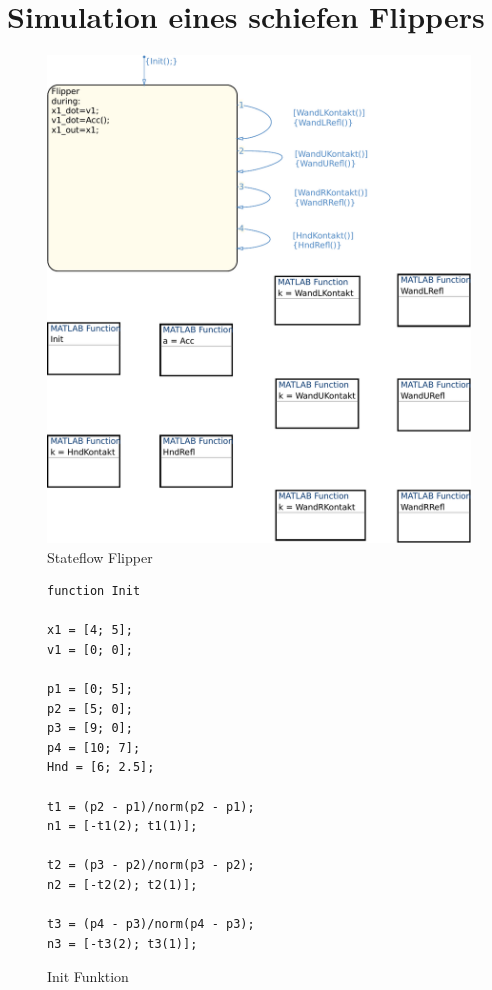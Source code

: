 \documentclass[10pt,a4paper]{article}
\begin{document}
\section{Simulation eines schiefen Flippers}
\begin{figure}[H]
	\centering
	\includegraphics[width=1\textwidth]{../aufgabe2/screens/Flipper}
	 	 	 	 		\caption{Stateflow Flipper}
\end{figure}

\begin{figure}[H]
\begin{lstlisting}
function Init

x1 = [4; 5];
v1 = [0; 0];

p1 = [0; 5];
p2 = [5; 0];
p3 = [9; 0];
p4 = [10; 7];
Hnd = [6; 2.5];

t1 = (p2 - p1)/norm(p2 - p1);
n1 = [-t1(2); t1(1)];

t2 = (p3 - p2)/norm(p3 - p2);
n2 = [-t2(2); t2(1)];

t3 = (p4 - p3)/norm(p4 - p3);
n3 = [-t3(2); t3(1)];
\end{lstlisting}
\caption{Init Funktion}
\end{figure}
\end{document}
